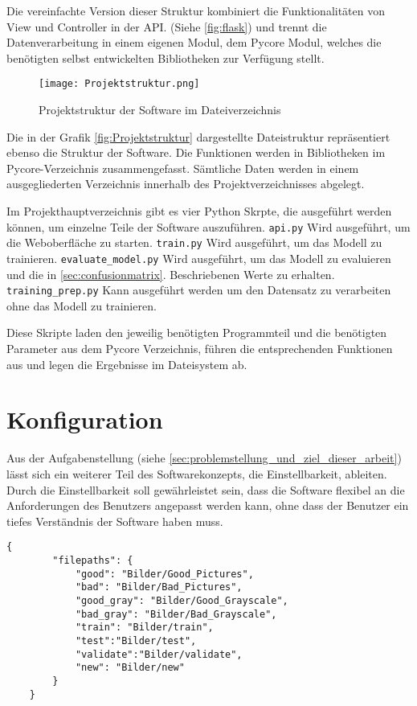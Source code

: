 Die vereinfachte Version dieser Struktur kombiniert die Funktionalitäten von View und Controller in der API. (Siehe \autoref{fig:flask}) und trennt die Datenverarbeitung in einem eigenen Modul, dem Pycore Modul, welches die benötigten selbst entwickelten Bibliotheken zur Verfügung stellt. 

\begin{figure}[H]
    \centering
    \texttt{[image: Projektstruktur.png]}
    \caption{Projektstruktur der Software im Dateiverzeichnis}
    \label{fig:Projektstruktur}
\end{figure}

Die in der Grafik \autoref{fig:Projektstruktur} dargestellte Dateistruktur repräsentiert ebenso die Struktur der Software. Die Funktionen werden in Bibliotheken im Pycore-Verzeichnis zusammengefasst. 
Sämtliche Daten werden in einem ausgegliederten Verzeichnis innerhalb des Projektverzeichnisses abgelegt. 

Im Projekthauptverzeichnis gibt es vier Python Skrpte, die ausgeführt werden können, um einzelne Teile der Software auszuführen.
\texttt{api.py} Wird ausgeführt, um die Weboberfläche zu starten.
\texttt{train.py} Wird ausgeführt, um das Modell zu trainieren.
\texttt{evaluate\_model.py} Wird ausgeführt, um das Modell zu evaluieren und die in \autoref{sec:confusionmatrix}. Beschriebenen Werte zu erhalten. 
\texttt{training\_prep.py} Kann ausgeführt werden um den Datensatz zu verarbeiten ohne das Modell zu trainieren.

Diese Skripte laden den jeweilig benötigten Programmteil und die benötigten Parameter aus dem Pycore Verzeichnis, führen die entsprechenden Funktionen aus und legen die Ergebnisse im Dateisystem ab.


\section{Konfiguration} \label{sec:konfiguration}

Aus der Aufgabenstellung (siehe \autoref{sec:problemstellung_und_ziel_dieser_arbeit}) lässt sich ein weiterer Teil des Softwarekonzepts, die Einstellbarkeit, ableiten.
Durch die Einstellbarkeit soll gewährleistet sein, dass die Software flexibel an die Anforderungen des Benutzers angepasst werden kann, ohne dass der Benutzer ein tiefes Verständnis der Software haben muss.

\begin{lstlisting}[style=json, label=lst:json_example, caption={Beispiel einer \ac{JSON}-Datei mit Parametern des mobilnet Modells}]
    {
        "filepaths": {
            "good": "Bilder/Good_Pictures",
            "bad": "Bilder/Bad_Pictures",
            "good_gray": "Bilder/Good_Grayscale",
            "bad_gray": "Bilder/Bad_Grayscale",
            "train": "Bilder/train",
            "test":"Bilder/test",
            "validate":"Bilder/validate",
            "new": "Bilder/new"
        }
    }
\end{lstlisting}

